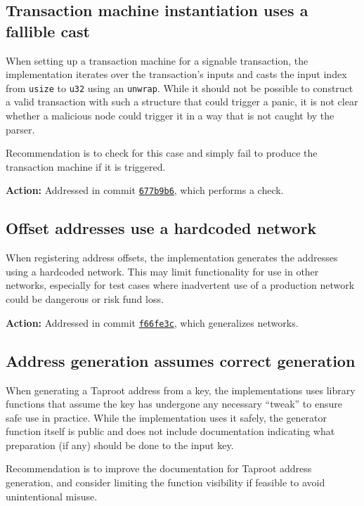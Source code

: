 \documentclass{article}
\begin{document}
\subsection{Transaction machine instantiation uses a fallible cast}

When setting up a transaction machine for a signable transaction, the implementation iterates over the transaction's inputs and casts the input index from \texttt{usize} to \texttt{u32} using an \texttt{unwrap}.
While it should not be possible to construct a valid transaction with such a structure that could trigger a panic, it is not clear whether a malicious node could trigger it in a way that is not caught by the parser.

Recommendation is to check for this case and simply fail to produce the transaction machine if it is triggered.

\textbf{Action:} Addressed in commit \href{https://github.com/serai-dex/serai/commit/677b9b681f5e2819fe34599beb0947adc22afabd}{\texttt{677b9b6}}, which performs a check.


\subsection{Offset addresses use a hardcoded network}

When registering address offsets, the implementation generates the addresses using a hardcoded network.
This may limit functionality for use in other networks, especially for test cases where inadvertent use of a production network could be dangerous or risk fund loss.

\textbf{Action:} Addressed in commit \href{https://github.com/serai-dex/serai/commit/f66fe3c1cb56f90f9d1f1ba8c4d2ff4dc6fa9768}{\texttt{f66fe3c}}, which generalizes networks.


\subsection{Address generation assumes correct generation}

When generating a Taproot address from a key, the implementations uses library functions that assume the key has undergone any necessary ``tweak'' to ensure safe use in practice.
While the implementation uses it safely, the generator function itself is public and does not include documentation indicating what preparation (if any) should be done to the input key.

Recommendation is to improve the documentation for Taproot address generation, and consider limiting the function visibility if feasible to avoid unintentional misuse.
\end{document}
